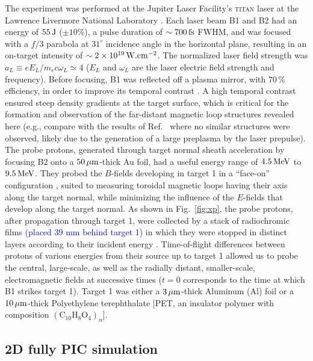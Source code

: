 \documentclass[aps,showpacs,superscriptaddress]{revtex4}
\begin{document}
The experiment was performed at the Jupiter Laser Facility's \textsc{titan} laser at the Lawrence Livermore National Laboratory \cite{RSI_Albertazzi_2015}. Each laser beam B1 and B2 had an energy of $55\,\rm J$ ($\pm 10\%$), a pulse duration of $\sim 700\,\rm fs$ FWHM, and was focused with a $f/3$ parabola at $31^\circ$ incidence angle in the horizontal plane, resulting in an on-target intensity of $\sim 2\times 10^{19}\,\rm W.cm^{-2}$. The normalized laser field strength was $a_L \equiv eE_L/m_e c\omega_L \simeq 4$ ($E_L$ and $\omega_L$ are the laser electric field strength and frequency). Before focusing, B1 was reflected off a plasma mirror, with $70\,\%$ efficiency, in order to improve its temporal contrast \cite{PRE_Doumy_2004}. A high temporal contrast ensured steep density gradients at the target surface, which is critical for the formation and observation of the far-distant magnetic loop structures revealed here (e.g., compare with the results of Ref.~\cite{PRL_Sarri_2012} where no similar structures were observed, likely due to the generation of a large preplasma by the laser prepulse). 
The probe protons, generated through target normal sheath acceleration \cite{PRL_Fuchs_2003} by focusing B2 onto a $50\,\rm \mu m$-thick Au foil, had a useful energy range of $4.5\,\rm MeV$ to $9.5\,\rm MeV$. They probed the $B$-fields developing in target 1 in a ``face-on'' configuration \cite{RSI_Albertazzi_2015}, suited to measuring toroidal magnetic loops having their axis along the target normal, while minimizing the influence of the $E$-fields that develop along the target normal. As shown in Fig.~\ref{fig:xp}, the probe protons, after propagation through target 1, were collected by a stack of radiochromic films \textcolor{blue}{(placed 39 mm behind target 1)} in which they were stopped in distinct layers according to their incident energy \cite{RSI_Chen_2016}. Time-of-flight differences between protons of various energies from their source up to target 1 allowed us to probe the central, large-scale, as well as the radially distant, smaller-scale, electromagnetic fields at successive times ($t=0$ corresponds to the time at which B1 strikes target 1). Target 1 was either a $3\,\rm \mu m$-thick Aluminum (Al) foil or a $10\,\rm \mu m$-thick Polyethylene terephthalate [PET, an insulator polymer with composition $(\mathrm{C}_{10}\mathrm{H}_8\mathrm{O}_4)_n$].
 
\subsection*{2D fully PIC simulation}
\end{document}

